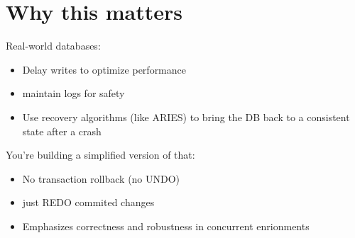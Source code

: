 \section{Why this matters}
Real-world databases: 
\begin{itemize}
	\item Delay writes to optimize performance
	\item maintain logs for safety 
	\item Use recovery algorithms (like ARIES) to bring the DB back to a consistent state after a crash	
\end{itemize}

You're building a simplified version of that: 
\begin{itemize}
	\item No transaction rollback (no UNDO)
	\item just REDO commited changes
	\item Emphasizes correctness and robustness in concurrent enrionments	
\end{itemize}